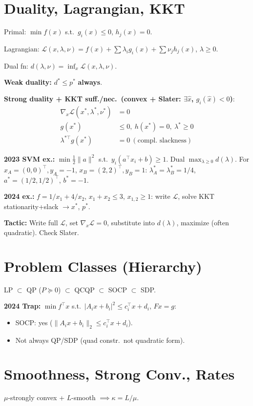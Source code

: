 \section*{Duality, Lagrangian, KKT}
Primal: \(\min f(x)\) s.t.\ \(g_i(x)\le0\), \(h_j(x)=0\).

Lagrangian: \(\mathcal L(x,\lambda,\nu)=f(x)+\sum\lambda_i
g_i(x)+\sum\nu_j h_j(x)\), \(\lambda\ge0\).

Dual fn: \(d(\lambda,\nu)=\inf_x\mathcal L(x,\lambda,\nu)\).

\textbf{Weak duality:} \(d^*\le p^*\) \textbf{always}.

\textbf{Strong duality + KKT suff./nec.\ (convex + Slater:
\(\exists\hat x\), \(g_i(\hat x)<0\))}:
\begin{align*}
  \nabla_x\mathcal L(x^*,\lambda^*,\nu^*)&=0\\
  g(x^*)&\le0,\ h(x^*)=0,\ \lambda^*\ge0\\
  \lambda^{*\top}g(x^*)&=0\ (\text{compl.\ slackness})
\end{align*}

\textbf{2023 SVM ex.:} \(\min\frac12\|a\|^2\) s.t.\ \(y_i(a^\top
x_i+b)\ge1\). Dual \(\max_{\lambda\ge0}d(\lambda)\). For
\(x_A=(0,0)^\top,y_A=-1\), \(x_B=(2,2)^\top,y_B=1\):
\(\lambda_A^*=\lambda_B^*=1/4\), \(a^*=(1/2,1/2)^\top\), \(b^*=-1\).

\textbf{2024 ex.:} \(f=1/x_1+4/x_2\), \(x_1+x_2\le3\),
\(x_{1,2}\ge1\): write \(\mathcal L\), solve KKT stationarity+slack
\(\to x^*\), \(p^*\).

\textbf{Tactic:} Write full \(\mathcal L\), set \(\nabla_x\mathcal
L=0\), substitute into \(d(\lambda)\), maximize (often quadratic). Check Slater.

\section*{Problem Classes (Hierarchy)}
LP \(\subset\) QP (\(P\succeq0\)) \(\subset\) QCQP \(\subset\) SOCP
\(\subset\) SDP.

\textbf{2024 Trap:} \(\min f^\top x\) s.t.\ \(|A_ix+b_i|^2\le
c_i^\top x+d_i\), \(Fx=g\):
\begin{itemize}
  \item SOCP: yes (\(\|A_ix+b_i\|_2\le c_i^\top x+d_i\)).
  \item Not always QP/SDP (quad constr.\ not quadratic form).
\end{itemize}

\section*{Smoothness, Strong Conv., Rates}
\(\mu\)-strongly convex + \(L\)-smooth \(\implies\kappa=L/\mu\).


